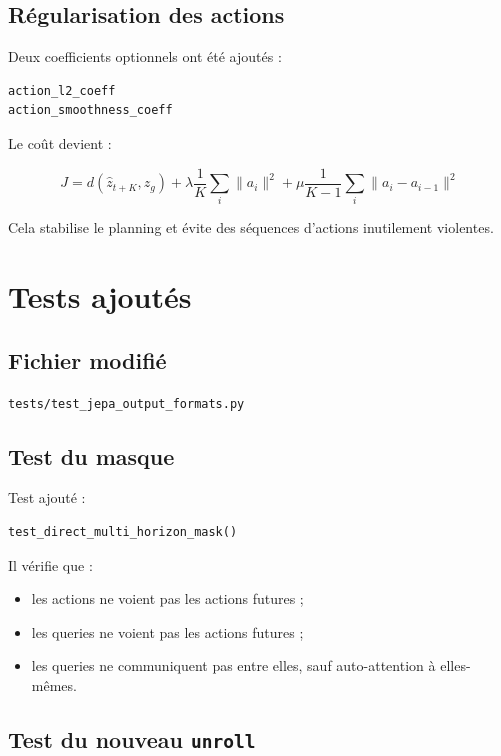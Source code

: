 \documentclass[11pt,a4paper]{article}
\newcommand{\filepath}[1]{\texttt{#1}}
\newcommand{\code}[1]{\texttt{#1}}
\begin{document}
\subsection{Régularisation des actions}

Deux coefficients optionnels ont été ajoutés :

\begin{lstlisting}[language=Python]
action_l2_coeff
action_smoothness_coeff
\end{lstlisting}

Le coût devient :

\[
J =
d(\hat z_{t+K}, z_g)
+
\lambda \frac{1}{K}\sum_i \|a_i\|^2
+
\mu \frac{1}{K-1}\sum_i \|a_i-a_{i-1}\|^2
\]

Cela stabilise le planning et évite des séquences d'actions inutilement violentes.

\section{Tests ajoutés}

\subsection{Fichier modifié}

\filepath{tests/test\_jepa\_output\_formats.py}

\subsection{Test du masque}

Test ajouté :

\begin{lstlisting}[language=Python]
test_direct_multi_horizon_mask()
\end{lstlisting}

Il vérifie que :

\begin{itemize}
  \item les actions ne voient pas les actions futures ;
  \item les queries ne voient pas les actions futures ;
  \item les queries ne communiquent pas entre elles, sauf auto-attention à elles-mêmes.
\end{itemize}

\subsection{Test du nouveau \code{unroll}}
\end{document}
